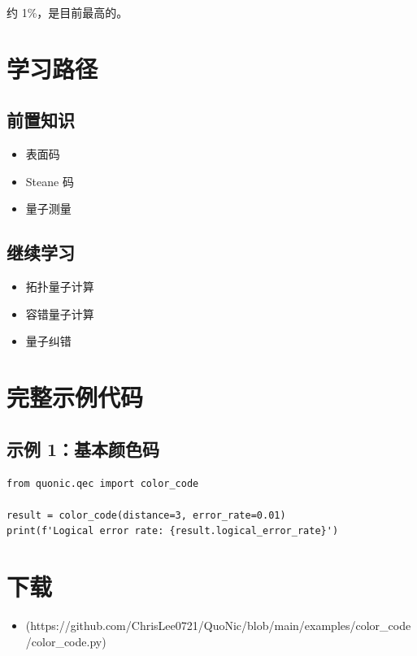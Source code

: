 \documentclass[12pt,a4paper]{article}
\begin{document}
约 1\%，是目前最高的。

\section{学习路径}

\subsection{前置知识}
\begin{itemize}
  \item 表面码
  \item Steane 码
  \item 量子测量
\end{itemize}

\subsection{继续学习}
\begin{itemize}
  \item 拓扑量子计算
  \item 容错量子计算
  \item 量子纠错
\end{itemize}

\section{完整示例代码}

\subsection{示例 1：基本颜色码}

\begin{verbatim}
from quonic.qec import color_code

result = color_code(distance=3, error_rate=0.01)
print(f'Logical error rate: {result.logical_error_rate}')
\end{verbatim}

\section{下载}

\begin{itemize}
  \item [color\_code.py](https://github.com/ChrisLee0721/QuoNic/blob/main/examples/color_code/color_code.py)
\end{itemize}
\end{document}
